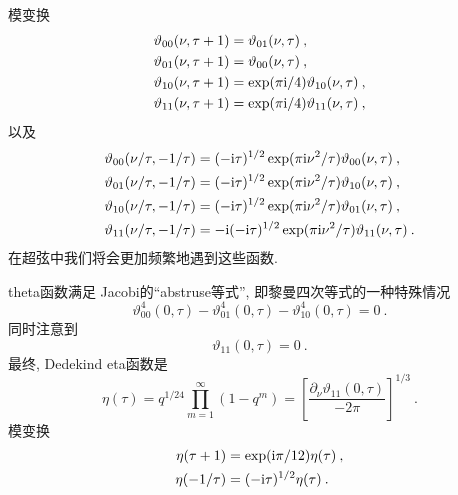 模变换
\begin{subequations} \label{7.2.39}
\begin{align}
\vartheta_{00}(\nu, \tau+1) &= \vartheta_{01}(\nu, \tau)  \:, \label{7.2.39a} \\
\vartheta_{01}(\nu, \tau+1) &= \vartheta_{00}(\nu, \tau)  \:, \label{7.2.39b} \\
\vartheta_{10}(\nu, \tau+1) &= \exp (\pi \mathrm{i} / 4) \vartheta_{10}(\nu, \tau) \:, \label{7.2.39c} \\
\vartheta_{11}(\nu, \tau+1) &= \exp (\pi \mathrm{i} / 4) \vartheta_{11}(\nu, \tau) \:, \label{7.2.39d}
\end{align}
\end{subequations}
以及
\begin{subequations} \label{7.2.40}
\begin{align}
	\vartheta_{00}(\nu/\tau,-1 / \tau) &= (-\mathrm{i} \tau)^{1/2} \exp(\pi \mathrm{i} \nu^{2}/\tau) \vartheta_{00}(\nu, \tau) \:, \label{7.2.40a} \\
	\vartheta_{01}(\nu/\tau,-1 / \tau) &= (-\mathrm{i} \tau)^{1/2} \exp(\pi \mathrm{i} \nu^{2}/\tau) \vartheta_{10}(\nu, \tau) \:, \label{7.2.40b} \\
	\vartheta_{10}(\nu/\tau,-1 / \tau) &= (-\mathrm{i} \tau)^{1/2} \exp(\pi \mathrm{i} \nu^{2}/\tau) \vartheta_{01}(\nu, \tau) \:, \label{7.2.40c} \\
	\vartheta_{11}(\nu/\tau,-1 / \tau) &=-\mathrm{i}(-\mathrm{i} \tau)^{1/2} \exp(\pi \mathrm{i} \nu^{2}/\tau) \vartheta_{11}(\nu, \tau) \:.  \label{7.2.40d}
\end{align}
\end{subequations}
在超弦中我们将会更加频繁地遇到这些函数. 

theta函数满足 Jacobi的``abstruse等式'', 即黎曼四次等式的一种特殊情况
\begin{equation}
	\vartheta_{00}^{4}(0, \tau)-\vartheta_{01}^{4}(0, \tau)-\vartheta_{10}^{4}(0, \tau)=0 \:. \label{7.2.41}
\end{equation}
同时注意到
\begin{equation}
	\vartheta_{11}(0, \tau)=0 \:. \label{7.2.42}
\end{equation}
最终, Dedekind eta函数是
\begin{equation}
	\eta(\tau)=q^{1 / 24} \prod_{m=1}^{\infty}(1-q^{m})=\left[\frac{\partial_{\nu} \vartheta_{11}(0, \tau)}{-2 \pi}\right]^{1/3} \:.
	\label{7.2.43}
\end{equation}
模变换
\begin{subequations} \label{7.2.44}
\begin{align}
\eta(\tau+1) &=\exp (\mathrm{i} \pi / 12) \eta(\tau)  \:, \label{7.2.44a} \\
\eta(-1 / \tau) &=(-\mathrm{i} \tau)^{1 / 2} \eta(\tau) \:. \label{7.2.44b}
\end{align}
\end{subequations}

